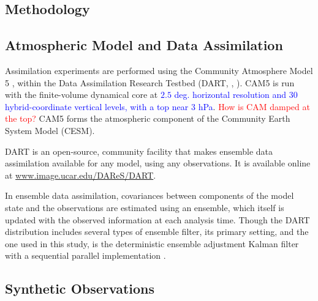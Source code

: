 \documentclass[draft,jgrga]{agutex}
\begin{document}
\begin{article}

\section{Methodology}

\subsection{Atmospheric Model and Data Assimilation}
Assimilation experiments are performed using the Community Atmosphere Model 5 \citep[CAM5 hereafter]{nealeetal2011}, within the Data Assimilation Research Testbed (DART, \citet{andersonetal2009}, \citet{raederetal2012}).
CAM5 is run with the finite-volume dynamical core at \textcolor{blue}{$2.5$ deg. horizontal resolution and 30 hybrid-coordinate vertical levels, with a top near 3 hPa}.
\textcolor{red}{How is CAM damped at the top?}
CAM5 forms the atmospheric component of the Community Earth System Model (CESM).

DART is an open-source, community facility that makes ensemble data assimilation available for any model, using any observations.
It is available online at \url{www.image.ucar.edu/DAReS/DART}.

In ensemble data assimilation, covariances between components of the model state and the observations are estimated using an ensemble, which itself is updated with the observed information at each analysis time.
Though the DART distribution includes several types of ensemble filter, its primary setting, and the one used in this study, is the deterministic ensemble adjustment  Kalman filter \citep[EAKF]{anderson2001} with a sequential parallel implementation \citep{andersoncollins2007}.

\subsection{Synthetic Observations}



\end{article}
\end{document}
